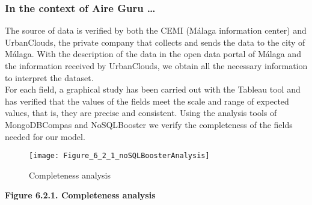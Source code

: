 \subsubsection*{In the context of Aire Guru \ldots} 

The source of data is verified by both the CEMI (Málaga information center) and UrbanClouds, the private company
that collects and sends the data to the city of Málaga. With the description of the data in the open data portal of Málaga and the information received by UrbanClouds,
we obtain all the necessary information to interpret the dataset. \\

For each field, a graphical study has been carried out with the Tableau tool and has verified that the values of the
fields meet the scale and range of expected values, that is, they are precise and consistent.
Using the analysis tools of MongoDBCompas and NoSQLBooster we verify the completeness of the fields needed for our model.

\begin{figure}[ht]
    \centering
    \texttt{[image: Figure\_6\_2\_1\_noSQLBoosterAnalysis]}
    \caption{Completeness analysis}
\end{figure}

\begin{center}
    \bf{ 
    Figure 6.2.1. Completeness analysis}
\end{center} 